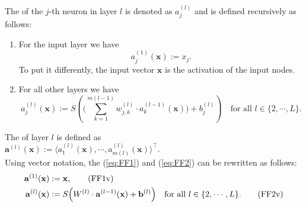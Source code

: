 \noindent
The  of the $j$-th neuron
in layer $l$ is denoted as $a_j^{(l)}$ and is defined recursively as follows:
\begin{enumerate}
\item For the input layer we have
      \begin{equation}
        \label{eq:FF1}
       a^{(1)}_j(\mathbf{x}) := x_j.
       \tag{FF1}
      \end{equation}
      To put it differently, the input vector $\mathbf{x}$ is the activation of the input nodes.
\item For all other layers we have
      \begin{equation}
         \label{eq:FF2}
         a_j^{(l)}(\mathbf{x}) := 
             S\left(\Biggl(\sum\limits_{k=1}^{m(l-1)} w_{j,k}^{(l)}\cdot a_k^{(l-1)}(\mathbf{x})\Biggr) + b_{j}^{(l)}\right) 
        \quad \mbox{for all $l \in \{2, \cdots, L\}$}.
       \tag{FF2}
\end{equation}
\end{enumerate}
The   of layer $l$ is defined as
\\[0.2cm]
\hspace*{1.3cm}
$\mathbf{a}^{(l)}(\mathbf{x}) := \bigl\langle a_1^{(l)}(\mathbf{x}), \cdots, a_{m(l)}^{(l)}(\mathbf{x}) \bigr\rangle^\top$.
\\[0.2cm]
Using vector notation, the  
(\ref{eq:FF1}) and (\ref{eq:FF2}) can be rewritten as follows:
\begin{align}
  \label{eq:FF1v}
  \mathbf{a}^{(1)}(\mathbf{x}) & := \mathbf{x},
  \tag{FF1v} \\ 
  \label{eq:FF2v}
  \mathbf{a}^{(l)}(\mathbf{x}) & := 
  S\Bigl( W^{(l)} \cdot \mathbf{a}^{(l-1)}(\mathbf{x}) + \mathbf{b}^{(l)}\Bigr)
  \quad \mbox{for all $l \in \{2, \cdots, L\}$}.
  \tag{FF2v}
\end{align}

